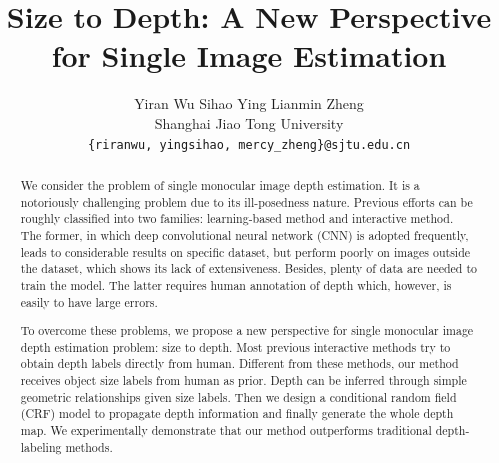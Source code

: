 \documentclass[10pt,twocolumn,letterpaper]{article}
\begin{document}
\title{Size to Depth: A New Perspective for Single Image Estimation}

\author{Yiran Wu \hspace{2cm} Sihao Ying \hspace{2cm} Lianmin Zheng\\
Shanghai Jiao Tong University\\
{\tt\small \{riranwu, yingsihao, mercy_zheng\}@sjtu.edu.cn}
}

\maketitle
\ifwacvfinal\thispagestyle{empty}\fi

\begin{abstract}
We consider the problem of single monocular image depth estimation. It is a notoriously challenging problem due to its ill-posedness nature. Previous efforts can be roughly classified into two families: learning-based method and interactive method. The former, in which deep convolutional neural network (CNN) is adopted frequently, leads to considerable results on specific dataset, but perform poorly on images outside the dataset, which shows its lack of extensiveness. Besides, plenty of data are needed to train the model. The latter requires human annotation of depth which, however, is easily to have large errors.

To overcome these problems, we propose a new perspective for single monocular image depth estimation problem: size to depth. Most previous interactive methods try to obtain depth labels directly from human. Different from these methods, our method receives object size labels from human as prior. Depth can be inferred through simple geometric relationships given size labels. Then we design a conditional random field (CRF) model to propagate depth information and finally generate the whole depth map. We experimentally demonstrate that our method outperforms traditional depth-labeling methods.
\end{abstract}
\end{document}
